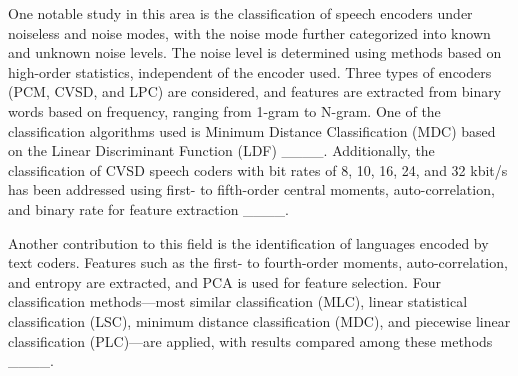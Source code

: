 One notable study in this area is the classification of speech encoders under noiseless and noise modes, with the noise mode further categorized into known and unknown noise levels. The noise level is determined using methods based on high-order statistics, independent of the encoder used. Three types of encoders (PCM, CVSD, and LPC) are considered, and features are extracted from binary words based on frequency, ranging from 1-gram to N-gram. One of the classification algorithms used is Minimum Distance Classification (MDC) based on the Linear Discriminant Function (LDF) ____. Additionally, the classification of CVSD speech coders with bit rates of 8, 10, 16, 24, and 32 kbit/s has been addressed using first- to fifth-order central moments, auto-correlation, and binary rate for feature extraction ____.

Another contribution to this field is the identification of languages encoded by text coders. Features such as the first- to fourth-order moments, auto-correlation, and entropy are extracted, and PCA is used for feature selection. Four classification methods—most similar classification (MLC), linear statistical classification (LSC), minimum distance classification (MDC), and piecewise linear classification (PLC)—are applied, with results compared among these methods ____.